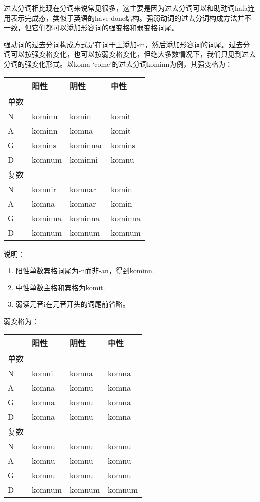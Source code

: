 过去分词相比现在分词来说常见很多，这主要是因为过去分词可以和助动词hafa连用表示完成态，类似于英语的have
done结构。强弱动词的过去分词构成方法并不一致，但它们都可以添加形容词的强变格和弱变格词尾。

强动词的过去分词构成方式是在词干上添加-in，然后添加形容词的词尾。过去分词可以按强变格变化，也可以按弱变格变化，但绝大多数情况下，我们只见到过去分词的强变化形式。以koma
`come‌'的过去分词kominn为例，其强变格为：

\begin{longtable}{llll}
  \toprule
     & 阳性      & 阴性       & 中性      \\
  \midrule
  \endhead
  \bottomrule
  \endfoot
  单数 &         &          &         \\
  N  & kominn  & komin    & komit   \\
  A  & kominn  & komna    & komit   \\
  G  & komins  & kominnar & komins  \\
  D  & komnum  & kominni  & komnu   \\
  复数 &         &          &         \\
  N  & komnir  & komnar   & komin   \\
  A  & komna   & komnar   & komin   \\
  G  & kominna & kominna  & kominna \\
  D  & komnum  & komnum   & komnum  \\
\end{longtable}

说明：

\begin{enumerate}
  \def\labelenumi{\arabic{enumi})}
  \item
        阳性单数宾格词尾为-n而非-an，得到kominn.
  \item
        中性单数主格和宾格为komit.
  \item
        弱读元音i在元音开头的词尾前省略。
\end{enumerate}

弱变格为：

\begin{longtable}{llll}
  \toprule
     & 阳性     & 阴性     & 中性     \\
  \midrule
  \endhead
  \bottomrule
  \endfoot
  单数 &        &        &        \\
  N  & komni  & komna  & komna  \\
  A  & komna  & komnu  & komna  \\
  G  & komna  & komnu  & komna  \\
  D  & komna  & komnu  & komna  \\
  复数 &        &        &        \\
  N  & komnu  & komnu  & komnu  \\
  A  & komnu  & komnu  & komnu  \\
  G  & komnu  & komnu  & komnu  \\
  D  & komnum & komnum & komnum \\
\end{longtable}

